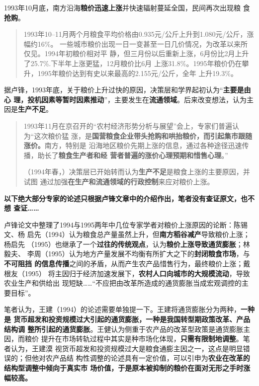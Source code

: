 1993年10月底，南方沿海\textbf{粮价迅速上涨}并快速辐射蔓延全国，民间再次出现粮
食\textbf{抢购}。
\begin{quotation}
  1993年10--11月两个月粮食平均价格由0.935元/公斤上升到1.080元/公斤，涨幅约16\%。
  一些城市粮价出现一日一变甚至一日几价情况，为改革以来所仅见。1994年初粮价相对平
  静，但三月份以后重新上涨，6月份比2月上升了25.7\%.下半年上涨更猛，12月粮价比6月
  上涨31.8\%。1995年粮价仍在攀升，1995年粮价达到有史以来最高的2.155元/公斤，全年
  上升19.3\%。\cite{lufengsanci}
\end{quotation}

据卢锋，1993年底，关于粮价上升过快的原因，决策层和学界起初认为“\textbf{主要是由心
  理，投机因素等暂时因素推动}”，主要发生在\textbf{流通领域}。后来改变想法，认为主
因是\textbf{生产不足}。
\begin{quotation}
  1993年11月在京召开的“农村经济形势分析与展望”会上，专家们普遍认为“这次粮价猛
  涨，是\textbf{国营粮食企业带头抢购和哄抬粮价，而引起集市跟随涨价。}南方，特别是
  沿海地区粮价先期上涨的信息，通过各种途径迅速传播，助长了\textbf{粮食生产者和经
    营者普遍的涨价心理预期和惜售心理}。”

  （1994年春，）决策层已开始转而认为\textbf{生产不足}是粮食上涨的主要原因，并试图
  通过加强\textbf{在生产和流通领域的行政控制}来应对粮价上涨。
\end{quotation}

\textbf{以下绝大部分专家的论述只根据卢锋文章中的介绍作出，笔者没有查证原文，也不想
  查证……}

卢锋论文中整理了1994与1995两年中几位专家学者对粮价上涨原因的论断：陈锡文、杨
启先（1994）认为粮食总产量虽然上升，但\textbf{南方稻谷减产}导致粮价上涨；杨启先
（1995）也继承了一个\textbf{过往的传统观点}，认为\textbf{粮价上涨导致通货膨胀}；林毅夫、
李周（1995）认为地方产量发展不均衡有所扩大之下的\textbf{封闭粮食市场}，与\textbf{不可阻挡
  的信息传播}之间的矛盾，从而产生农产品惜售行为，最终粮价上涨；戴根友（1995）
将主因归于经济加速发展下，\textbf{农村人口向城市的大规模流动}，导致农业生产和供给出
现短缺……“不应把由改革所造成的通货膨胀当成宏观调控的主要目标”。

笔者认为，王建（1994）的论述需要单独提一下。王建将通货膨胀分为两种，\textbf{一种是
  货币超发和投资规模过大引起的通货膨胀，一种是我国转型期政策改革、产品结构调
  整所引起的通货膨胀}。王健认为侧重于农产品的改革型政策是通货膨胀主因，而粮价
提升在市场转轨过程中其实是种市场化体现，\textbf{只需有限制地调整}。笔者认为，王建漠
视货币超发和投资规模过大是粮食通膨主因之一，这点是明显错误的；但他对农产品结
构性调整的论述具有一定价值，可以引申为\textbf{农业在改革的结构型调整中倾向于真实市
  场价值，于是原本被抑制的粮价在面对无形之手时涨幅较高。}

